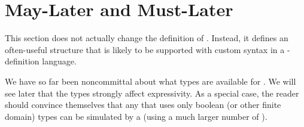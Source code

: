 \documentclass[12pt]{article}
\begin{document}
\section{May-Later and Must-Later}  \label{slater}


This section does not actually change the definition of \Contract. Instead, it defines an often-useful \Contract structure that is likely to be supported with custom syntax in a \Contract-definition language.

We have so far been noncommittal about what types are available for \GVars.%
We will see later that the types strongly affect expressivity. As a special case, the reader should convince themselves that any \Contract that uses only boolean (or other finite domain) types can be simulated by a \FSContract (using a much larger number of \States).



\end{document}

